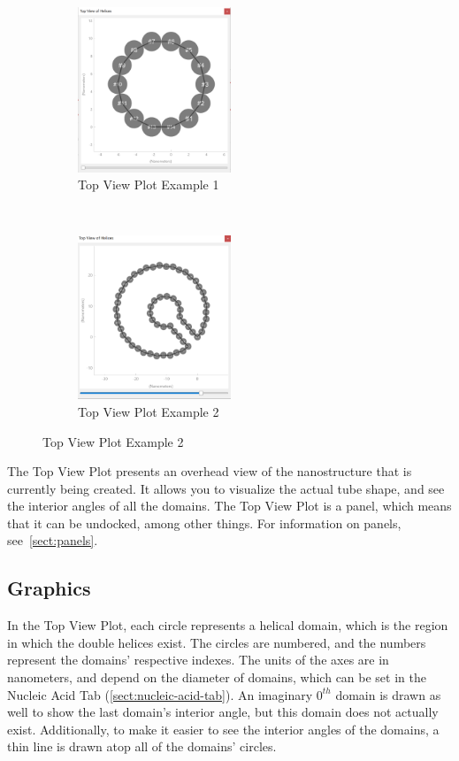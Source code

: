 \documentclass[titlepage]{article}
\begin{document}
	\begin{figure}[h]
		\centering
		\label{fig:top-view-plot-panel}
		\caption{Top View Plot Panel}
		\begin{subfigure}{.45\linewidth}
			\centering
			\label{fig:top-view-plot-panel-1}
			\includegraphics[width=1.8in]{top-view-plot.png}
			\caption{Top View Plot Example 1}
		\end{subfigure}%
		~
		\begin{subfigure}{.45\linewidth}
			\centering
			\label{fig:top-view-plot-panel-2}
			\includegraphics[width=1.8in]{top-view-plot-2.png}
			\caption{Top View Plot Example 2}
		\end{subfigure}
	\end{figure}
	
	The Top View Plot presents an overhead view of the nanostructure that is currently being created. It allows you to visualize the actual tube shape, and see the interior angles of all the domains. The Top View Plot is a panel, which means that it can be undocked, among other things. For information on panels, see~\ref{sect:panels}.
	
	\subsection{Graphics}
	In the Top View Plot, each circle represents a helical domain, which is the region in which the double helices exist. The circles are numbered, and the numbers represent the domains' respective indexes. The units of the axes are in nanometers, and depend on the diameter of domains, which can be set in the Nucleic Acid Tab (\ref{sect:nucleic-acid-tab}). An imaginary $0^{th}$ domain is drawn as well to show the last domain's interior angle, but this domain does not actually exist. Additionally, to make it easier to see the interior angles of the domains, a thin line is drawn atop all of the domains' circles.
	
\end{document}
